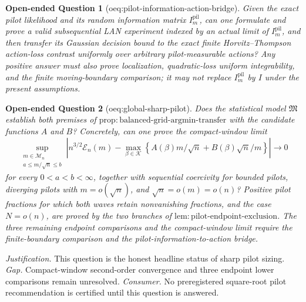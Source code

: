 \documentclass{article}
\newtheorem{openendedquestion}{Open-ended Question}
\begin{document}
\begin{openendedquestion}[oeq:pilot-information-action-bridge]\label{oeq:pilot-information-action-bridge}
Given the exact pilot likelihood and its random information matrix \(I_m^{\mathrm{pil}}\), can one formulate and prove a valid subsequential LAN experiment indexed by an actual limit of \(I_m^{\mathrm{pil}}\), and then transfer its Gaussian decision bound to the exact finite Horvitz--Thompson action-loss contrast uniformly over arbitrary pilot-measurable actions?  Any positive answer must also prove localization, quadratic-loss uniform integrability, and the finite moving-boundary comparison; it may not replace \(I_m^{\mathrm{pil}}\) by \(I\) under the present assumptions.
\end{openendedquestion}

\begin{openendedquestion}[oeq:global-sharp-pilot]\label{oeq:global-sharp-pilot}
Does the statistical model \(\mathfrak M\) establish both premises of \(\mathrm{prop{:}balanced\text{-}grid\text{-}argmin\text{-}transfer}\) with the candidate functions \(A\) and \(B\)?  Concretely, can one prove the compact-window limit
\[
\sup_{\substack{m\in\mathcal M_n\\ a\leq m/\sqrt n\leq b}}
\left|n^{3/2}\mathcal E_n(m)
-\max_{\beta\in\mathcal K}
\left\{A(\beta)m/\sqrt n+B(\beta)\sqrt n/m\right\}\right|
\longrightarrow0
\]
for every \(0<a<b<\infty\), together with sequential coercivity for bounded pilots, diverging pilots with \(m=o(\sqrt n)\), and \(\sqrt n=o(m)=o(n)\)?  Positive pilot fractions for which both waves retain nonvanishing fractions, and the case \(N=o(n)\), are proved by the two branches of \(\mathrm{lem{:}pilot\text{-}endpoint\text{-}exclusion}\).  The three remaining endpoint comparisons and the compact-window limit require the finite-boundary comparison and the pilot-information-to-action bridge.
\end{openendedquestion}
\par\smallskip\noindent \textit{Justification.} This question is the honest headline status of sharp pilot sizing. \textit{Gap.} Compact-window second-order convergence and three endpoint lower comparisons remain unresolved. \textit{Consumer.} No preregistered square-root pilot recommendation is certified until this question is answered.
\end{document}
